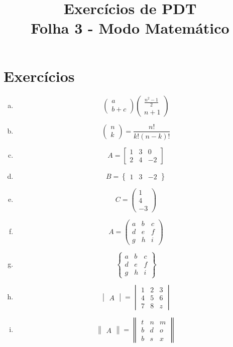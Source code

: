 \documentclass[12pt,a4paper]{article}
\title{Exercícios de PDT\\Folha 3 - Modo Matemático}
\date{}
\begin{document}
\maketitle
\section{Exercícios}
\begin{enumerate}[a)]
\item $$\begin{pmatrix}
a\\
b + c
\end{pmatrix}
\begin{pmatrix}
\frac{n^2-1}{2}\\
n + 1
\end{pmatrix}$$
\item $$\begin{pmatrix}
n\\
k
\end{pmatrix}=\frac{n!}{k!\left(n-k\right)!}$$
\item $$A=\begin{bmatrix}
1&3&0\\
2&4&-2
\end{bmatrix}$$
\item $$B=\begin{Bmatrix}
1&3&-2
\end{Bmatrix}$$
\item $$C=\begin{pmatrix}
1\\
4\\
-3
\end{pmatrix}$$
\item $$A=\begin{pmatrix}
a&b&c\\
d&e&f\\
g&h&i
\end{pmatrix}$$
\item $$\begin{Bmatrix}
a&b&c\\
d&e&f\\
g&h&i
\end{Bmatrix}$$
\item $$\begin{vmatrix}
A
\end{vmatrix}=\begin{vmatrix}
1&2&3\\
4&5&6\\
7&8&z
\end{vmatrix}$$
\item $$\begin{Vmatrix}
A
\end{Vmatrix}=\begin{Vmatrix}
t&n&m\\
b&d&o\\
b&s&x
\end{Vmatrix}$$
\end{enumerate}
\end{document}

